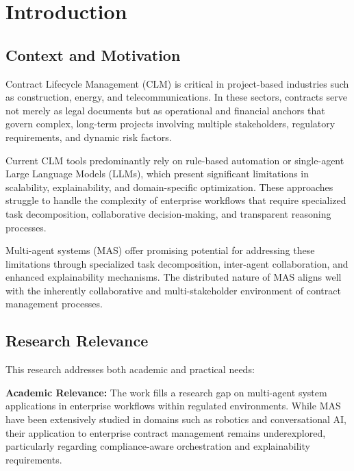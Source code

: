 
\chapter{Introduction}\label{chapter:introduction}

\section{Context and Motivation}

Contract Lifecycle Management (CLM) is critical in project-based industries such as construction, energy, and telecommunications. In these sectors, contracts serve not merely as legal documents but as operational and financial anchors that govern complex, long-term projects involving multiple stakeholders, regulatory requirements, and dynamic risk factors.

Current CLM tools predominantly rely on rule-based automation or single-agent Large Language Models (LLMs), which present significant limitations in scalability, explainability, and domain-specific optimization. These approaches struggle to handle the complexity of enterprise workflows that require specialized task decomposition, collaborative decision-making, and transparent reasoning processes.

Multi-agent systems (MAS) offer promising potential for addressing these limitations through specialized task decomposition, inter-agent collaboration, and enhanced explainability mechanisms. The distributed nature of MAS aligns well with the inherently collaborative and multi-stakeholder environment of contract management processes.

\section{Research Relevance}

This research addresses both academic and practical needs:

\textbf{Academic Relevance:} The work fills a research gap on multi-agent system applications in enterprise workflows within regulated environments. While MAS have been extensively studied in domains such as robotics and conversational AI, their application to enterprise contract management remains underexplored, particularly regarding compliance-aware orchestration and explainability requirements.

